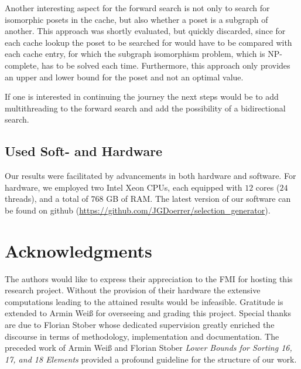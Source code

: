 \documentclass[10pt,journal,compsoc]{IEEEtran}
\begin{document}
Another interesting aspect for the forward search is not only to search for
isomorphic posets in the cache, but also whether a poset is a subgraph of
another. This approach was shortly evaluated, but quickly discarded, since for
each cache lookup the poset to be searched for would have to be compared with
each cache entry, for which the subgraph isomorphism problem, which is
NP-complete, has to be solved each time. Furthermore, this approach only
provides an upper and lower bound for the poset and not an optimal value.

If one is interested in continuing the journey the next steps would be to add
multithreading to the forward search and add the possibility of a bidirectional
search.


\subsection{Used Soft- and Hardware} \label{sec:hardware}

Our results were facilitated by advancements in both hardware and software. For
hardware, we employed two Intel Xeon CPUs, each equipped with $12$ cores ($24$
threads), and a total of $768$ GB of RAM.
The latest version of our software can be found on github
(\url{https://github.com/JGDoerrer/selection_generator}).





\section*{Acknowledgments}

The authors would like to express their appreciation to the FMI for hosting this
research project. Without the provision of their hardware the extensive
computations leading to the attained results would be infeasible. Gratitude is
extended to Armin Weiß for overseeing and grading this project. Special thanks
are due to Florian Stober whose dedicated supervision greatly enriched the
discourse in terms of methodology, implementation and documentation. The
preceded work of Armin Weiß and Florian Stober \textit{Lower Bounds for Sorting
  16, 17, and 18 Elements} \cite{stober2022lower} provided a profound guideline
for the structure of our work.

\ifCLASSOPTIONcaptionsoff
  \newpage
\fi




\end{document}
